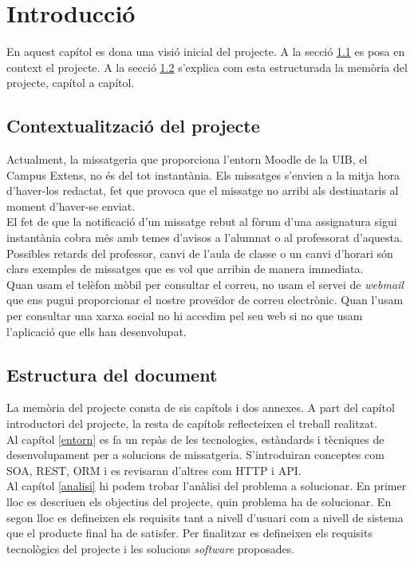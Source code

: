 \chapter{Introducció}
En aquest capítol es dona una visió inicial del projecte. A la secció \ref{contexte} es posa en context el projecte. A la secció \ref{estructura_document} s'explica com esta estructurada la memòria del projecte, capítol a capítol.

\section{Contextualització del projecte}\label{contexte}
Actualment, la missatgeria que proporciona l'entorn Moodle de la \ac{UIB}, el Campus Extens, no és del tot instantània. Els missatges s'envien a la mitja hora d'haver-los redactat, fet que provoca que el missatge no arribi als destinataris al moment d'haver-se enviat. \\

El fet de que la notificació d'un missatge rebut al fòrum d'una assignatura sigui instantània cobra més amb temes d'avisos a l'alumnat o al professorat d'aquesta. Possibles retards del professor, canvi de l'aula de classe o un canvi d'horari són clars exemples de missatges que es vol que arribin de manera immediata.\\

Quan usam el telèfon mòbil per consultar el correu, no usam el servei de \emph{webmail} que ens pugui proporcionar el nostre proveïdor de correu electrònic. Quan l'usam per consultar una xarxa social no hi accedim pel seu web si no que usam l'aplicació que ells han desenvolupat. 

 
\section{Estructura del document}\label{estructura_document}
La memòria del projecte consta de sis capítols i dos annexes. A part del capítol introductori del projecte, la resta de capítols reflecteixen el treball realitzat.\\

Al capítol \ref{entorn} es fa un repàs de les tecnologies, estàndards i tècniques de desenvolupament per a solucions de missatgeria. S'introduiran conceptes com \ac{SOA}, \ac{REST}, \ac{ORM} i es revisaran d'altres com \ac{HTTP} i \ac{API}.\\

Al capítol \ref{analisi} hi podem trobar l'anàlisi del problema a solucionar. En primer lloc es descriuen els objectius del projecte, quin problema ha de solucionar. En segon lloc es defineixen els requisits tant a nivell d'usuari com a nivell de sistema que el producte final ha de satisfer. Per finalitzar es defineixen els requisits tecnològics del projecte i les solucions \emph{software} proposades.

